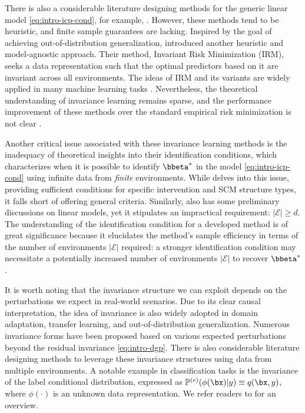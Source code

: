 \documentclass[10pt]{article}
\numberwithin{equation}{section}
\begin{document}
{There is also a considerable literature designing methods for the generic linear model \eqref{eq:intro-icp-cond}, for example, \cite{ rojas2018invariant, pfister2021stabilizing, yin2021optimization}. However, these methods tend to be heuristic, and finite sample guarantees are lacking. Inspired by the goal of achieving out-of-distribution generalization, \cite{arjovsky2019invariant} introduced another heuristic and model-agnostic approach. Their method, Invariant Risk Minimization (IRM), seeks a data representation such that the optimal predictors based on it are invariant across all environments. The ideas of IRM and its variants are widely applied in many machine learning tasks \citep{sagawa2019distributionally, zhang2020invariant, krueger2021out, lu2021nonlinear}. Nevertheless, the theoretical understanding of invariance learning remains sparse, and the performance improvement of these methods over the standard empirical risk minimization is not clear \citep{rosenfeld2020risks, kamath2021does}. 

Another critical issue associated with these invariance learning methods is the inadequacy of theoretical insights into their identification conditions, which characterizes when it is possible to identify $\bbeta^*$ in the model \eqref{eq:intro-icp-cond} using infinite data from {\it finite} environments. While \cite{peters2016causal} delves into this issue, providing sufficient conditions for specific intervention and SCM structure types, it falls short of offering general criteria. Similarly, \cite{arjovsky2019invariant} also has some preliminary discussions on linear models, yet it stipulates an impractical requirement: $|\mathcal{E}| \ge d$. The understanding of the identification condition for a developed method is of great significance because it elucidates the method's sample efficiency in terms of the number of environments $|\mathcal{E}|$ required: a stronger identification condition may necessitate a potentially increased number of environments $|\mathcal{E}|$ to recover $\bbeta^*$.

It is worth noting that the invariance structure we can exploit depends on the perturbations we expect in real-world scenarios. Due to its clear causal interpretation, the idea of invariance is also widely adopted in domain adaptation, transfer learning, and out-of-distribution generalization. Numerous invariance forms have been proposed based on various expected perturbations beyond the residual invariance \eqref{eq:intro-dgp}. There is also considerable literature designing methods to leverage these invariance structures \citep{muandet2013domain, gong2016domain, heinze2021conditional} using data from multiple environments. A notable example in classification tasks is the invariance of the label conditional distribution, expressed as $\mathbb{P}^{(e)}(\phi(\bx)|y)\equiv q(\bx, y)$, where $\phi(\cdot)$ is an unknown data representation. We refer readers to \cite{chen2021domain, wang2023causal} for an overview.


}
\end{document}
